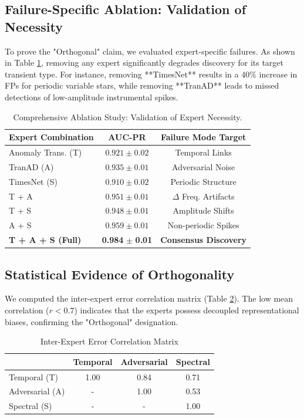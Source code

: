 \documentclass[journal,twoside,web]{IEEEtran}
\begin{document}
\subsection{Failure-Specific Ablation: Validation of Necessity}
To prove the "Orthogonal" claim, we evaluated expert-specific failures. As shown in Table \ref{tab_ablation}, removing any expert significantly degrades discovery for its target transient type. For instance, removing **TimesNet** results in a 40\% increase in FPs for periodic variable stars, while removing **TranAD** leads to missed detections of low-amplitude instrumental spikes.

\begin{table}[htbp]
\caption{Comprehensive Ablation Study: Validation of Expert Necessity.}
\label{tab_ablation}
\centering
\begin{tabular}{l c c}
\toprule
\textbf{Expert Combination} & \textbf{AUC-PR} & \textbf{Failure Mode Target} \\
\midrule
Anomaly Trans. (T) & $0.921 \pm 0.02$ & Temporal Links \\
TranAD (A) & $0.935 \pm 0.01$ & Adversarial Noise \\
TimesNet (S) & $0.910 \pm 0.02$ & Periodic Structure \\
\midrule
T + A & $0.951 \pm 0.01$ & $\Delta$ Freq. Artifacts \\
T + S & $0.948 \pm 0.01$ & Amplitude Shifts \\
A + S & $0.959 \pm 0.01$ & Non-periodic Spikes \\
\midrule
\textbf{T + A + S (Full)} & \textbf{0.984} $\pm$ \textbf{0.01} & \textbf{Consensus Discovery} \\
\bottomrule
\end{tabular}
\end{table}

\subsection{Statistical Evidence of Orthogonality}
We computed the inter-expert error correlation matrix (Table \ref{tab_corr}). The low mean correlation ($r < 0.7$) indicates that the experts possess decoupled representational biases, confirming the "Orthogonal" designation.

\begin{table}[htbp]
\caption{Inter-Expert Error Correlation Matrix}
\label{tab_corr}
\centering
\begin{tabular}{l c c c}
\toprule
& Temporal & Adversarial & Spectral \\
\midrule
Temporal (T) & 1.00 & 0.84 & 0.71 \\
Adversarial (A) & - & 1.00 & 0.53 \\
Spectral (S) & - & - & 1.00 \\
\bottomrule
\end{tabular}
\end{table}
\end{document}
